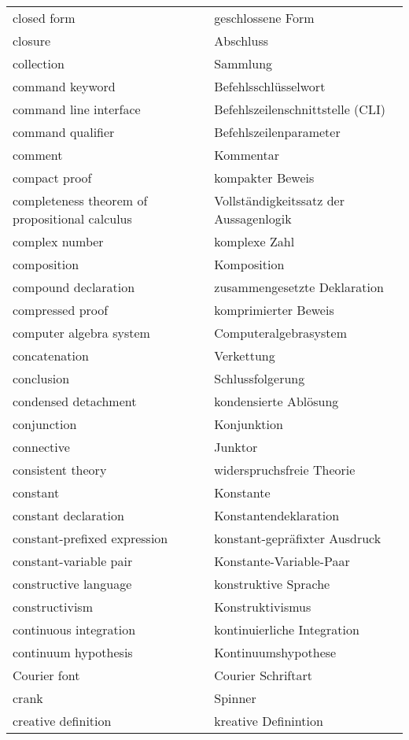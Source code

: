\begin{longtabu}   { @{} X[l] X[l] }
    closed form & geschlossene Form \\
    closure & Abschluss \\
    collection & Sammlung \\
    command keyword & Befehlsschlüsselwort \\
    command line interface & Befehlszeilenschnittstelle (CLI) \\
    command qualifier & Befehlszeilenparameter \\
    comment & Kommentar \\
    compact proof & kompakter Beweis \\
    completeness theorem of propositional calculus & Vollständigkeitssatz der Aussagenlogik \\
    complex number & komplexe Zahl \\
    composition & Komposition \\
    compound declaration & zusammengesetzte Deklaration \\
    compressed proof & komprimierter Beweis \\
    computer algebra system & Computeralgebrasystem \\
    concatenation & Verkettung \\
    conclusion & Schlussfolgerung \\
    condensed detachment & kondensierte Ablösung \\
    conjunction & Konjunktion \\
    connective & Junktor \\
    consistent theory & widerspruchsfreie Theorie \\
    constant & Konstante \\
    constant declaration & Konstantendeklaration \\
    constant-prefixed expression & konstant-gepräfixter Ausdruck \\
    constant-variable pair & Konstante-Variable-{\allowbreak}Paar \\
    constructive language & konstruktive Sprache \\
    constructivism & Konstruktivismus \\
    continuous integration & kontinuierliche Integration \\
    continuum hypothesis & Kontinuumshypothese \\
    Courier font & Courier Schriftart \\
    crank & Spinner \\
    creative definition & kreative Definintion \\

\end{longtabu}
